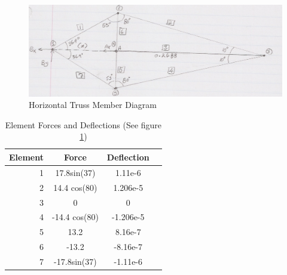 \begin{figure}[p]
    \centering
    \includegraphics[width=.80\textwidth]{images/horizontalDiagram}
    \caption{Horizontal Truss Member Diagram} %
    \label{fig:horizontalDiagram}
\end{figure}

\begin{table}[p]
	\centering
	\caption{Element Forces and Deflections (See figure \ref{fig:horizontalDiagram})}
	\label{tbl:horizontalAnalysis}
	\vspace{6pt}
	\begin{tabular}{rccc}
		\toprule
		Element & Force& Deflection  \\
		\midrule
		1 &  17.8sin(37)  &  1.11e-6 \\
		2 &  14.4 cos(80)  &  1.206e-5 \\
		3 &  0                    &  0 \\
		4 &  -14.4 cos(80)  &  -1.206e-5 \\
		5 &  13.2              &  8.16e-7 \\
		6 &  -13.2            &  -8.16e-7 \\
		7 & -17.8sin(37) & -1.11e-6 \\
		\bottomrule
	\end{tabular}
\end{table}